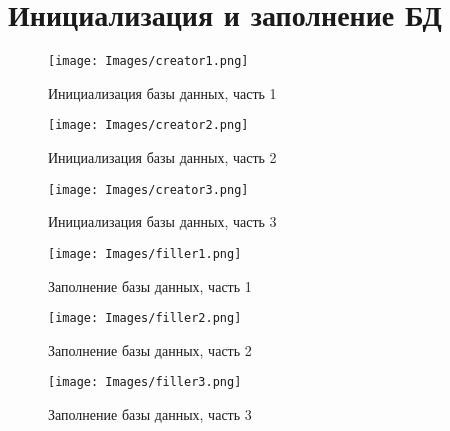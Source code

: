 \section{Инициализация и заполнение БД}

\begin{figure}[h]
\centering
\texttt{[image: Images/creator1.png]}
\caption{Инициализация базы данных, часть 1}
\end{figure}

\begin{figure}[h]
\centering
\texttt{[image: Images/creator2.png]}
\caption{Инициализация базы данных, часть 2}
\end{figure}

\begin{figure}[h]
\centering
\texttt{[image: Images/creator3.png]}
\caption{Инициализация базы данных, часть 3}
\end{figure}


\begin{figure}[h]
\centering
\texttt{[image: Images/filler1.png]}
\caption{Заполнение базы данных, часть 1}
\end{figure}

\begin{figure}[h]
\centering
\texttt{[image: Images/filler2.png]}
\caption{Заполнение базы данных, часть 2}
\end{figure}

\begin{figure}[h]
\centering
\texttt{[image: Images/filler3.png]}
\caption{Заполнение базы данных, часть 3}
\end{figure}

\newpage